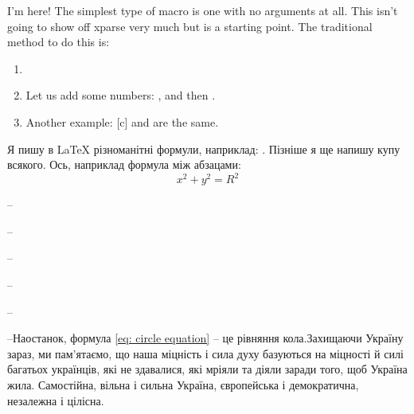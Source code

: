 \documentclass[14pt]{extarticle}
\begin{document}
I'm here! The simplest type of macro is one with no arguments at all. This isn’t going to show off xparse very much but is a starting point. The traditional method to do this is: 

\begin{enumerate}[label=($\bigstar$)]
    \item \NoArguments
    \item Let us add some numbers: , and then .
    \item Another example: [c] and  are the same.
\end{enumerate}

Я пишу в \LaTeX{} різноманітні формули, наприклад: . Пізніше я ще напишу купу всякого. Ось, наприклад формула між абзацами:
\begin{equation}\label{eq: circle equation}
    x^2 + y^2 = R^2
\end{equation}

\newcommand{\parcount}{--\hspace{0.1cm}\addtocounter{par}{1}\thepar\hspace{0.1cm}--\hspace{0.2cm}}

\parcount \lipsum[2]

\parcount \lipsum[3]

\parcount Наостанок, формула \eqref{eq: circle equation} -- це рівняння кола.Захищаючи Україну зараз, ми пам'ятаємо, що наша міцність і \cite{Gentle1998} сила духу базуються на міцності й силі багатьох українців, які не здавалися, які мріяли та діяли заради того, щоб Україна жила. Самостійна, \cite{Eddy2004} вільна і сильна Україна, європейська і демократична, \cite{Sharma2009} незалежна і цілісна.

\newpage
\printbibliography
\end{document}
